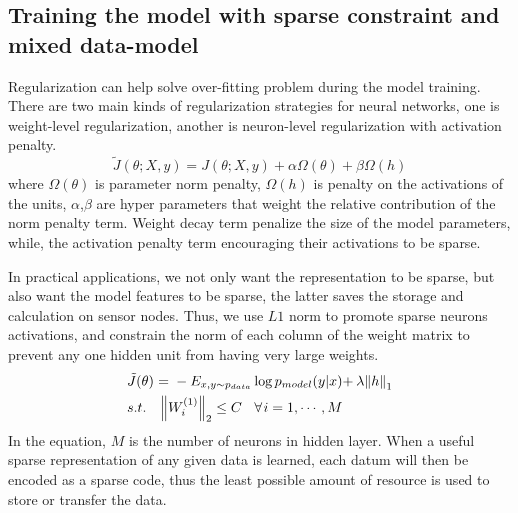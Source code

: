 \subsection{Training the model with sparse constraint and mixed data-model}
Regularization can help solve over-fitting problem during the model training.
There are two main kinds of regularization strategies for neural networks, one is weight-level regularization, another is neuron-level regularization with activation penalty.
\begin{equation}
\tilde J(\theta ;X,y) = J(\theta ;X,y) + \alpha \Omega (\theta )+ \beta \Omega (h)
\end{equation}
where $\Omega (\theta )$ is parameter norm penalty, $\Omega (h)$ is penalty on the activations of the units, $\alpha$,$\beta$ are hyper parameters that weight the relative contribution of
the norm penalty term. Weight decay term penalize the size of the model parameters, while, the activation penalty term encouraging their activations to be sparse.

In practical applications, we not only want the representation to be sparse, but also want the model features to be sparse, the latter saves the storage and calculation on sensor nodes. Thus, we use $L1$ norm to promote sparse neurons activations, and constrain the norm of each column of the weight matrix to prevent any one hidden unit from having very large weights.
\begin{equation}
\begin{split}
&\tilde J(\theta ){\kern 1pt} {\kern 1pt} {\kern 1pt} {\rm{ = }}{\kern 1pt} {\kern 1pt} {\kern 1pt}  - {E_{x,y \sim {p_{data}}}}\log {p_{model}}(y|x){\rm{ + }}{\kern 1pt} {\kern 1pt} \lambda {\left\| h \right\|_1}\\
& s.t.{\kern 1pt} {\kern 1pt} {\kern 1pt} {\kern 1pt} {\kern 1pt} {\kern 1pt} {\kern 1pt} {\kern 1pt} {\kern 1pt} {\kern 1pt} {\left\| {{W^{(1)}_i}} \right\|_2} \le C{\kern 1pt} {\kern 1pt} {\kern 1pt} {\kern 1pt} {\kern 1pt} {\kern 1pt} {\kern 1pt} {\kern 1pt} {\kern 1pt} \forall {\kern 1pt} i = 1, \cdots ,M\\
\end{split}
\end{equation}
In the equation, $M$ is the number of neurons in hidden layer.
When a useful sparse representation of any given data is learned, each datum will then be encoded as a sparse code, thus the least possible amount of resource is used to store or transfer the data.

